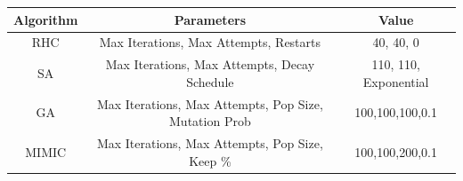 \documentclass[11pt]{article}
\begin{document}
    \begin{center}
        \begin{tabular}{| c | c | c |}
            \hline
            Algorithm & Parameters                                            & Value                 \\
            \hline
            \hline
            RHC       & Max Iterations, Max Attempts, Restarts                & 40, 40, 0             \\
            \hline
            SA        & Max Iterations, Max Attempts, Decay Schedule          & 110, 110, Exponential \\
            \hline
            GA        & Max Iterations, Max Attempts, Pop Size, Mutation Prob & 100,100,100,0.1       \\
            \hline
            MIMIC     & Max Iterations, Max Attempts, Pop Size, Keep \%       & 100,100,200,0.1       \\
            \hline
        \end{tabular}
    \end{center}
    
    
\end{document}
